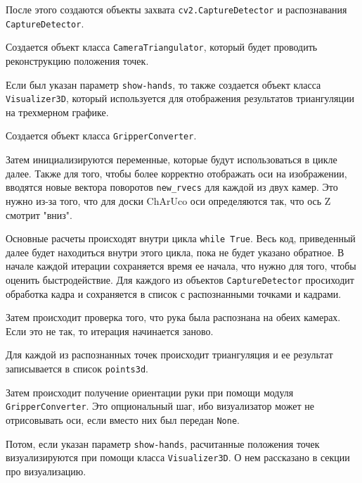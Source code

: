 \documentclass[12pt, a4paper]{article}
\begin{document}
После этого создаются объекты захвата \texttt{cv2.CaptureDetector} и
распознавания \texttt{CaptureDetector}.

Создается объект класса \texttt{CameraTriangulator}, который будет проводить
реконструкцию положения точек. 

Если был указан параметр \texttt{show-hands}, то также создается объект класса
\texttt{Visualizer3D}, который используется для отображения результатов
триангуляции на трехмерном графике.

Создается объект класса \texttt{GripperConverter}.

Затем инициализируются переменные, которые будут использоваться в цикле далее.
Также для того, чтобы более корректно отображать оси на изображении, вводятся
новые вектора поворотов \texttt{new\_rvecs} для каждой из двух камер. Это нужно
из-за того, что для доски ChArUco оси определяются так, что ось Z смотрит "вниз".

Основные расчеты происходят внутри цикла \texttt{while True}. Весь код,
приведенный далее будет находиться внутри этого цикла, пока не будет указано
обратное. В начале каждой итерации сохраняется время ее начала, что нужно для
того, чтобы оценить быстродействие. Для каждого из объектов
\texttt{CaptureDetector} просиходит обработка кадра и сохраняется в список с
распознанными точками и кадрами.

Затем происходит проверка того, что рука была распознана на обеих камерах. Если
это не так, то итерация начинается заново.

Для каждой из распознанных точек происходит триангуляция и ее результат
записывается в список \texttt{points3d}.

Затем происходит получение ориентации руки при помощи модуля
\texttt{GripperConverter}. Это опциональный шаг, ибо визуализатор может не
отрисовывать оси, если вместо них был передан \texttt{None}.

Потом, если указан параметр \texttt{show-hands}, расчитанные положения точек визуализируются при помощи класса
\texttt{Visualizer3D}. О нем рассказано в секции про визуализацию.
\end{document}
